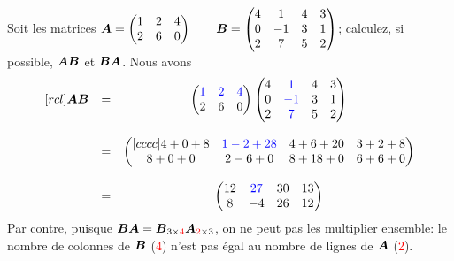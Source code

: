 \begin{exemple}
Soit les matrices
$\displaystyle
\boldsymbol{A} = \begin{pmatrix}
	1 & 2 & 4 \\
	2 & 6 & 0
	\end{pmatrix}
\qquad
\boldsymbol{B} = \begin{pmatrix}
	4 & 1 & 4 & 3\\
	0 & -1 & 3 & 1 \\
	2 & 7 & 5 & 2
	\end{pmatrix}
$;
calculez, si possible, $\boldsymbol{A}\boldsymbol{B}$ et $\boldsymbol{B}\boldsymbol{A}$.
\solution
Nous avons
\[
\begin{matrix}[rcl]
\boldsymbol{A}\boldsymbol{B} & = & \begin{pmatrix}
	\textcolor{blue}{1} & \textcolor{blue}{2} & \textcolor{blue}{4} \\
	2 & 6 & 0
	\end{pmatrix}
	\begin{pmatrix}
	4 & \textcolor{blue}{1} & 4 & 3\\
	0 & \textcolor{blue}{-1} & 3 & 1 \\
	2 & \textcolor{blue}{7} & 5 & 2
	\end{pmatrix} \\
	\\
	&=& \begin{pmatrix}[cccc]
	4+0+8 & \textcolor{blue}{1-2+28} & 4+6+20 & 3 + 2 + 8 \\
	8+0+0 & 2-6+0 & 8+18+0 & 6+6+0
	\end{pmatrix}\\
	\\
	&=& \begin{pmatrix}
	12 & \textcolor{blue}{27} & 30 & 13 \\
	8 & -4 & 26 & 12
	\end{pmatrix}
	\end{matrix}
\]
Par contre, puisque $\boldsymbol{B}\boldsymbol{A} = \boldsymbol{B}_{3\times\textcolor{red}{4}}\boldsymbol{A}_{\textcolor{red}{2}\times3}$, 
on ne peut pas les multiplier ensemble: le nombre de colonnes de $\boldsymbol{B}$ (\textcolor{red}{\tiny 4}) n'est pas égal au
nombre de lignes de $\boldsymbol{A}$ (\textcolor{red}{\tiny 2}).
\end{exemple}

